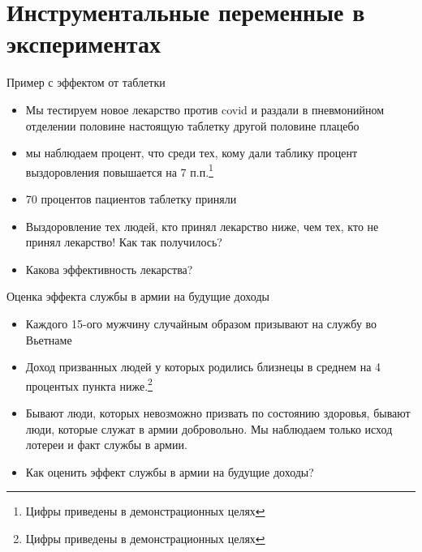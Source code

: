 

\section{Инструментальные переменные в экспериментах}


\begin{frame}{Пример с эффектом от таблетки}
\begin{itemize}
    \item Мы тестируем новое лекарство против covid и раздали в пневмонийном отделении половине настоящую таблетку другой половине плацебо
    \item мы наблюдаем процент, что среди тех, кому дали таблику процент выздоровления повышается на 7 п.п.\footnote{Цифры приведены в демонстрационных целях}
    \item 70 процентов пациентов таблетку приняли
    \item Выздоровление тех людей, кто принял лекарство ниже, чем тех, кто не принял лекарство! Как так получилось?
    \item Какова эффективность лекарства? 
\end{itemize}
\end{frame}


\begin{frame}{Оценка эффекта службы в армии на будущие доходы \parencite{angrist1990lifetime}}
\begin{itemize}
    \item Каждого 15-ого мужчину случайным образом призывают на службу во Вьетнаме
    \item Доход призванных людей у которых родились близнецы в среднем на 4 процентых пункта ниже.\footnote{Цифры приведены в демонстрационных целях}
    \item Бывают люди, которых невозможно призвать по состоянию здоровья, бывают люди, которые служат в армии добровольно. Мы наблюдаем только исход лотереи и факт службы в армии.
    \item Как оценить эффект службы в армии на будущие доходы?
\end{itemize}
\end{frame}

